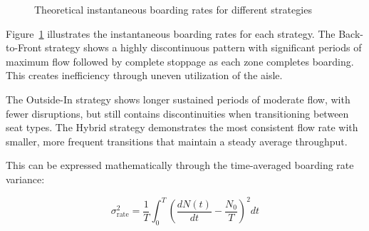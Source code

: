 \documentclass[12pt]{article}
\begin{document}
\begin{figure}[h]
    \centering
    \caption{Theoretical instantaneous boarding rates for different strategies}
    \label{fig:boarding_rates}
\end{figure}

Figure~\ref{fig:boarding_rates} illustrates the instantaneous boarding rates for each strategy. The Back-to-Front strategy shows a highly discontinuous pattern with significant periods of maximum flow followed by complete stoppage as each zone completes boarding. This creates inefficiency through uneven utilization of the aisle.

The Outside-In strategy shows longer sustained periods of moderate flow, with fewer disruptions, but still contains discontinuities when transitioning between seat types. The Hybrid strategy demonstrates the most consistent flow rate with smaller, more frequent transitions that maintain a steady average throughput.

This can be expressed mathematically through the time-averaged boarding rate variance:

\begin{equation}
\sigma_{\text{rate}}^2 = \frac{1}{T}\int_{0}^{T}\left(\frac{dN(t)}{dt} - \frac{N_0}{T}\right)^2 dt
\end{equation}
\end{document}
